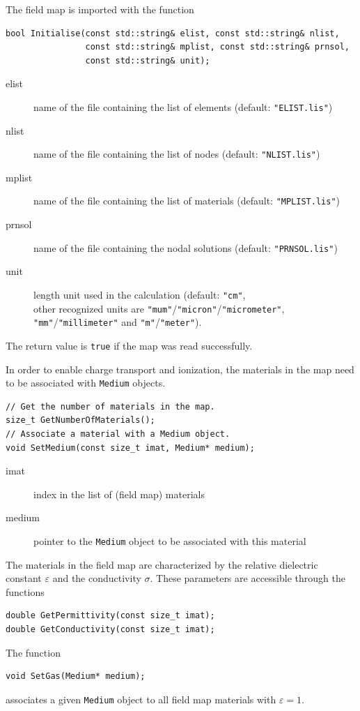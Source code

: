 The field map is imported with the function
\begin{lstlisting}
bool Initialise(const std::string& elist, const std::string& nlist,
                const std::string& mplist, const std::string& prnsol, 
                const std::string& unit);
\end{lstlisting}
\begin{description}
  \item[elist]
  name of the file containing the list of elements 
  (default: \texttt{"ELIST.lis"})
  \item[nlist]
  name of the file containing the list of nodes
  (default: \texttt{"NLIST.lis"})
  \item[mplist]
  name of the file containing the list of materials
  (default: \texttt{"MPLIST.lis"})
  \item[prnsol]
  name of the file containing the nodal solutions
  (default: \texttt{"PRNSOL.lis"})
  \item[unit]
  length unit used in the calculation (default: \texttt{"cm"}, \\ 
  other recognized units are 
  \texttt{"mum"}/\texttt{"micron"}/\texttt{"micrometer"},
  \texttt{"mm"}/\texttt{"millimeter"} and 
  \texttt{"m"}/\texttt{"meter"}).
\end{description}
The return value is \texttt{true} if the map was read successfully.

In order to enable charge transport and ionization,
the materials in the map need to be associated with \texttt{Medium} objects.
\begin{lstlisting}
// Get the number of materials in the map.
size_t GetNumberOfMaterials();
// Associate a material with a Medium object.
void SetMedium(const size_t imat, Medium* medium);
\end{lstlisting}
\begin{description}
\item[imat]
index in the list of (field map) materials
\item[medium]
pointer to the \texttt{Medium} object to be associated with this material
\end{description}

The materials in the field map are characterized by the 
relative dielectric constant \(\varepsilon\) and the 
conductivity \(\sigma\). 
These parameters are accessible through the functions
\begin{lstlisting}
double GetPermittivity(const size_t imat);
double GetConductivity(const size_t imat);
\end{lstlisting}
The function
\begin{lstlisting}
void SetGas(Medium* medium);
\end{lstlisting}
associates a given \texttt{Medium} object to all field map materials 
with $\varepsilon = 1$.
 
